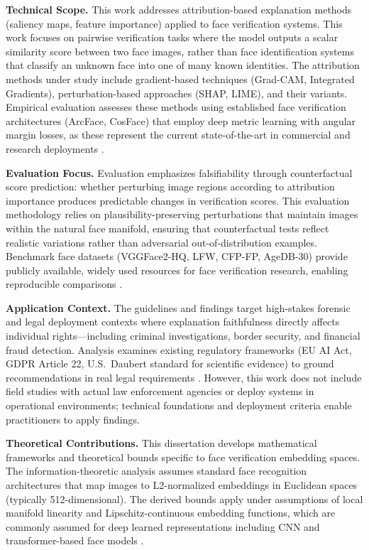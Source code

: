 \textbf{Technical Scope.} This work addresses attribution-based explanation methods (saliency maps, feature importance) applied to face verification systems. This work focuses on pairwise verification tasks where the model outputs a scalar similarity score between two face images, rather than face identification systems that classify an unknown face into one of many known identities. The attribution methods under study include gradient-based techniques (Grad-CAM, Integrated Gradients), perturbation-based approaches (SHAP, LIME), and their variants. Empirical evaluation assesses these methods using established face verification architectures (ArcFace, CosFace) that employ deep metric learning with angular margin losses, as these represent the current state-of-the-art in commercial and research deployments \cite{deng2019arcface,wang2018cosface}.

\textbf{Evaluation Focus.} Evaluation emphasizes falsifiability through counterfactual score prediction: whether perturbing image regions according to attribution importance produces predictable changes in verification scores. This evaluation methodology relies on plausibility-preserving perturbations that maintain images within the natural face manifold, ensuring that counterfactual tests reflect realistic variations rather than adversarial out-of-distribution examples. Benchmark face datasets (VGGFace2-HQ, LFW, CFP-FP, AgeDB-30) provide publicly available, widely used resources for face verification research, enabling reproducible comparisons \cite{cao2018vggface2,huang2007lfw,sengupta2016cfp,moschoglou2017agedb}.

\textbf{Application Context.} The guidelines and findings target high-stakes forensic and legal deployment contexts where explanation faithfulness directly affects individual rights---including criminal investigations, border security, and financial fraud detection. Analysis examines existing regulatory frameworks (EU AI Act, GDPR Article 22, U.S.\ Daubert standard for scientific evidence) to ground recommendations in real legal requirements \cite{euaiact2024,gdpr2016,fed702,daubert1993}. However, this work does not include field studies with actual law enforcement agencies or deploy systems in operational environments; technical foundations and deployment criteria enable practitioners to apply findings.

\textbf{Theoretical Contributions.} This dissertation develops mathematical frameworks and theoretical bounds specific to face verification embedding spaces. The information-theoretic analysis assumes standard face recognition architectures that map images to L2-normalized embeddings in Euclidean spaces (typically 512-dimensional). The derived bounds apply under assumptions of local manifold linearity and Lipschitz-continuous embedding functions, which are commonly assumed for deep learned representations \cite{bengio2013manifold} including CNN and transformer-based face models \cite{deng2019arcface}.

